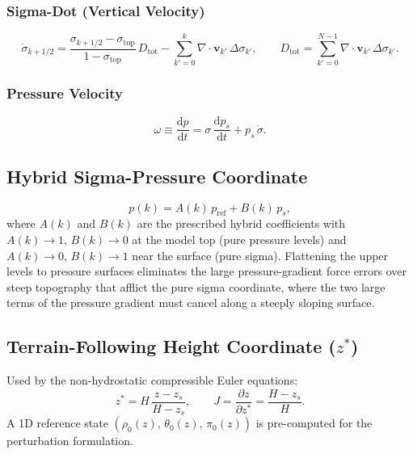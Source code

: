 \documentclass[11pt,twoside]{report}
\newcommand{\dd}{\mathrm{d}}
\newcommand{\pp}{\partial}
\newcommand{\vect}[1]{\bm{#1}}
\newcommand{\divg}{\nabla\!\cdot\!}
\begin{document}
\subsubsection{Sigma-Dot (Vertical Velocity)}
\begin{equation}
  \dot\sigma_{k+1/2} =
  \frac{\sigma_{k+1/2}-\sigma_{\mathrm{top}}}{1-\sigma_{\mathrm{top}}}
  \,D_{\mathrm{tot}}
  - \sum_{k'=0}^{k}\divg\vect{v}_{k'}\,\Delta\sigma_{k'},
  \qquad D_{\mathrm{tot}}=\sum_{k'=0}^{N-1}\divg\vect{v}_{k'}\,\Delta\sigma_{k'}.
\end{equation}

\subsubsection{Pressure Velocity}
\begin{equation}
  \omega \equiv \frac{\dd p}{\dd t}
  = \sigma\,\frac{\dd p_s}{\dd t} + p_s\,\dot\sigma.
\end{equation}

\subsection{Hybrid Sigma-Pressure Coordinate}

\begin{equation}
  p(k) = A(k)\,p_{\mathrm{ref}} + B(k)\,p_s,
\end{equation}
where $A(k)$ and $B(k)$ are the prescribed hybrid coefficients with
$A(k)\to 1,\,B(k)\to 0$ at the model top (pure pressure levels)
and $A(k)\to 0,\,B(k)\to 1$ near the surface (pure sigma).
Flattening the upper levels to pressure surfaces eliminates the large
pressure-gradient force errors over steep topography that afflict the pure
sigma coordinate, where the two large terms of the pressure gradient must
cancel along a steeply sloping surface.

\subsection{Terrain-Following Height Coordinate ($z^*$)}

Used by the non-hydrostatic compressible Euler equations:
\begin{equation}
  z^* = H\,\frac{z-z_s}{H-z_s}, \qquad
  J=\frac{\pp z}{\pp z^*}=\frac{H-z_s}{H}.
\end{equation}
A 1D reference state $(\rho_0(z),\,\theta_0(z),\,\pi_0(z))$ is
pre-computed for the perturbation formulation.
\end{document}
